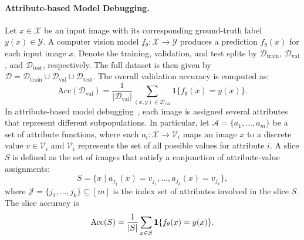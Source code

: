 \documentclass[10pt]{article} %
\begin{document}
\paragraph{Attribute-based Model Debugging.}  
Let \(x \in \mathcal{X}\) be an input image with its corresponding ground-truth label \(y(x) \in \mathcal{Y}\). A computer vision model \(f_\theta \colon \mathcal{X} \to \mathcal{Y}\) produces a prediction \(f_\theta(x)\) for each input image \(x\). Denote the training, validation, and test splits by \(\mathcal{D}_{\mathrm{train}}\), \(\mathcal{D}_{\mathrm{val}}\), and \(\mathcal{D}_{\mathrm{test}}\), respectively. The full dataset is then given by \(\mathcal{D} = \mathcal{D}_{\mathrm{train}} \cup \mathcal{D}_{\mathrm{val}} \cup \mathcal{D}_{\mathrm{test}}\). The overall validation accuracy is computed as: 
\vspace{-5pt}
\begin{equation}
\mathrm{Acc}(\mathcal{D}_{\mathrm{val}})
=\frac{1}{|\mathcal{D}_{\mathrm{val}}|}
\sum_{(x, y) \in \mathcal{D}_{\mathrm{val}}}
\mathbf{1}\{f_\theta(x) = y(x)\}.
\end{equation}
In attribute-based model debugging~\citep{chen2023hibug}, each image is assigned several attributes that represent different subpopulations. 
In particular, let \(\mathcal{A} = \{a_1, \dots, a_m\}\) be a set of attribute functions, where each \(a_i \colon \mathcal{X} \to \mathcal{V}_i\) maps an image \(x\) to a discrete value \(v \in \mathcal{V}_i\) and $\mathcal{V}_i$ represents the set of all possible values for attribute $i$. A slice $S$ is defined as the set of images that satisfy a conjunction of attribute-value assignments: 
\vspace{-5pt}
\begin{equation}
S = \{ x \mid a_{j_1}(x) = v_{j_1}, \dots, a_{j_k}(x) = v_{j_k}\},
\end{equation}
where \(\mathcal{J} = \{j_1, \dots, j_k\} \subseteq [m]\) is the index set of attributes involved in the slice \(S\).  
The slice accuracy is
\vspace{-5pt}
\begin{equation}
\mathrm{Acc}(S) = \frac{1}{|S|}\sum_{x\in S}\mathbf{1}\{f_\theta(x) = y(x)\}.
\vspace{-5pt}
\end{equation}

\vspace{-5pt}
\end{document}
